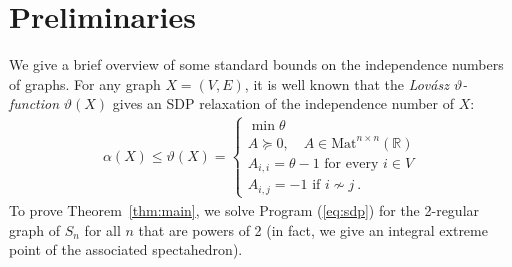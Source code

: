 \documentclass[12pt]{article}
\begin{document}
\section{Preliminaries}
We give a brief overview of some standard bounds on the independence numbers of graphs. For any graph $X = (V,E)$, it is well known that the \emph{Lov\'asz $\vartheta$-function} $\vartheta(X)$ gives an SDP relaxation of the independence number of $X$:
\begin{align}\label{eq:sdp}
	\alpha(X) \leq \vartheta(X) = 
	\begin{cases}
	\min \theta \\
	\text{$A \succeq 0$}, \quad 	A \in \mathrm{Mat}^{n \times n}(\mathbb{R}) \\
	A_{i,i} = \theta - 1 \text{ for every } i \in V\\
	A_{i,j} = -1 \text{ if $i \not \sim j$}~.
	\end{cases}
\end{align}
To prove Theorem~\ref{thm:main}, we solve Program (\ref{eq:sdp}) for the 2-regular graph of $S_n$ for all $n$ that are powers of 2 (in fact, we give an integral extreme point of the associated spectahedron). 
\end{document}
